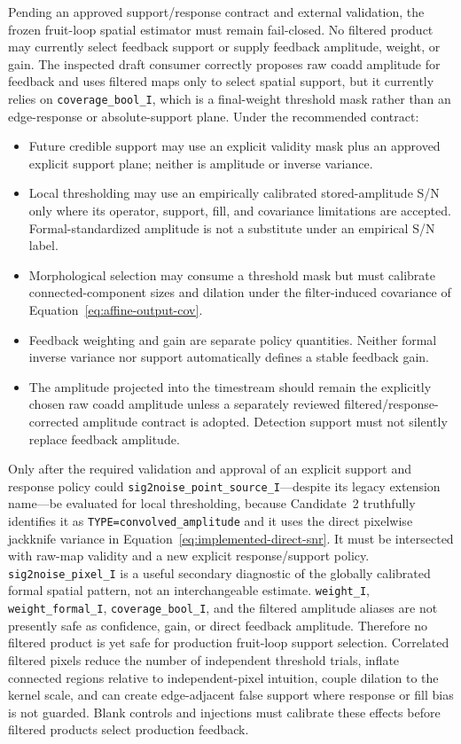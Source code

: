 \documentclass[11pt]{article}
\newcommand{\code}[1]{\nolinkurl{#1}}
\begin{document}
Pending an approved support/response contract and external validation, the
frozen fruit-loop spatial estimator must remain fail-closed.  No filtered
product may currently select feedback support or supply feedback amplitude,
weight, or gain.  The inspected draft consumer correctly proposes raw
coadd amplitude for feedback and uses filtered maps only to select spatial
support, but it currently relies on \code{coverage_bool_I}, which is a
final-weight threshold mask rather than an edge-response or absolute-support
plane.  Under the recommended contract:
\begin{itemize}
\item Future credible support may use an explicit validity mask plus an
approved explicit support plane; neither is amplitude or inverse variance.
\item Local thresholding may use an empirically calibrated stored-amplitude
S/N only where its operator, support, fill, and covariance limitations are
accepted.  Formal-standardized amplitude is not a substitute under an
empirical S/N label.
\item Morphological selection may consume a threshold mask but must calibrate
connected-component sizes and dilation under the filter-induced covariance of
Equation~\eqref{eq:affine-output-cov}.
\item Feedback weighting and gain are separate policy quantities.  Neither
formal inverse variance nor support automatically defines a stable feedback
gain.
\item The amplitude projected into the timestream should remain the explicitly
chosen raw coadd amplitude unless a separately reviewed filtered/response-
corrected amplitude contract is adopted.  Detection support must not silently
replace feedback amplitude.
\end{itemize}
Only after the required validation and approval of an explicit support and
response policy could \code{sig2noise_point_source_I}---despite its legacy
extension name---be evaluated for local thresholding, because Candidate~2
truthfully identifies it as
\code{TYPE=convolved_amplitude} and it uses the direct pixelwise jackknife
variance in Equation~\eqref{eq:implemented-direct-snr}.  It must be
intersected with raw-map validity and a new explicit response/support policy.
\code{sig2noise_pixel_I} is a useful secondary diagnostic of the globally
calibrated formal spatial pattern, not an interchangeable estimate.
\code{weight_I}, \code{weight_formal_I}, \code{coverage_bool_I}, and the
filtered amplitude aliases are not presently safe as confidence, gain, or
direct feedback amplitude.  Therefore no filtered product is yet safe for
production fruit-loop support selection.
Correlated filtered pixels reduce the number of independent threshold trials,
inflate connected regions relative to independent-pixel intuition, couple
dilation to the kernel scale, and can create edge-adjacent false support where
response or fill bias is not guarded.  Blank controls and injections must
calibrate these effects before filtered products select production feedback.
\end{document}
